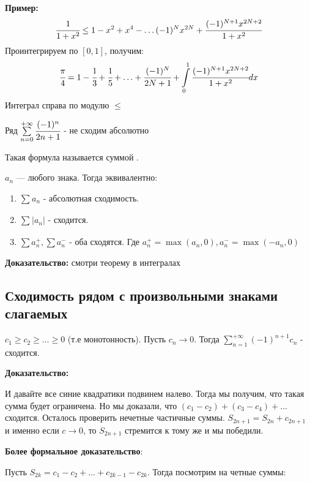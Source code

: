 \textbf{Пример:}
$$\cfrac{1}{1+x^2}\leq 1 - x^2  + x^4 - \ldots (-1)^N x^{2N} + \cfrac{(-1)^{N+1}x^{2N+2}}{1+x^2}$$
Проинтегрируем по $[0,1]$, получим:
$$\cfrac{\pi}{4}= 1 -\cfrac{1}{3} + \cfrac{1}{5}+\ldots +\cfrac{(-1)^N}{2N+1}+\displaystyle\int\limits_{0}^{1}\cfrac{(-1)^{N+1}x^{2N+2}}{1+x^2}dx$$
Интеграл справа по модулю $\leq$ %

Ряд $\sum\limits_{n=0}^{+\infty}\cfrac{(-1)^n}{2n+1}$ - не сходим абсолютно


Такая формула называется суммой . %


$a_n$ --- любого знака. Тогда эквивалентно:
\begin{enumerate}
    \item $\sum\limits_{}a_n$ - абсолютная сходимость.
    \item $\sum\limits_{}|a_n|$ - сходится.
    \item $\sum a_n^+, \sum a_n^-$ - оба сходятся. Где $a_n^+ = \max(a_n,0), a^-_n= \max(-a_n,0)$
\end{enumerate}

\textbf{Доказательство:} смотри теорему в интегралах

\pagebreak
\subsection{Сходимость рядом с произвольными знаками слагаемых}


$c_1 \geq c_2 \geq \ldots \geq 0$ (т.е монотонность). Пусть $c_n \rightarrow 0 $. Тогда $\sum\limits_{n=1}^{+\infty} (-1)^{n+1} c_n$ - сходится.

\textbf{Доказательство:}


И давайте все синие квадратики подвинем налево. Тогда мы получим, что такая сумма будет ограничена. Но мы доказали, что $(c_1-c_2) +(c_3-c_4) + \ldots$  сходится.  Осталось проверить нечетные частичные суммы. $S_{2n+1} =S_{2n}+ c_{2n+1}$ и именно если $c\rightarrow 0 $, то $S_{2n+1}$ стремится к тому же и мы победили.

\textbf{Более формальное доказательство}:

Пусть $S_{2k}  = c_1-c_2 + \ldots +c_{2k-1} - c_{2k}$. Тогда посмотрим на четные суммы:

